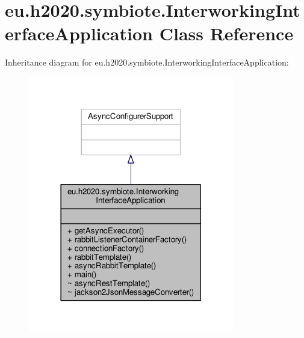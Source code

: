 \hypertarget{classeu_1_1h2020_1_1symbiote_1_1InterworkingInterfaceApplication}{}\section{eu.\+h2020.\+symbiote.\+Interworking\+Interface\+Application Class Reference}
\label{classeu_1_1h2020_1_1symbiote_1_1InterworkingInterfaceApplication}


Inheritance diagram for eu.\+h2020.\+symbiote.\+Interworking\+Interface\+Application\+:
\nopagebreak
\begin{figure}[H]
\begin{center}
\leavevmode
\includegraphics[width=254pt]{classeu_1_1h2020_1_1symbiote_1_1InterworkingInterfaceApplication__inherit__graph}
\end{center}
\end{figure}



